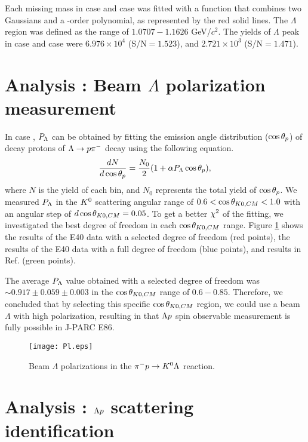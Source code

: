 \documentclass[a4paper,11pt,twoside,twocolumn]{article}
\begin{document}
Each missing mass in case  and case  was fitted with a function that combines two Gaussians and a -order polynomial, as represented by the red solid lines. The $\Lambda$ region was defined as the range of $1.0707 - 1.1626$ GeV/$c^{2}$. The yields of $\Lambda$ peak in case  and case  were $6.976\times10^{4}$ (S/N$=1.523$), and $2.721\times10^{3}$ (S/N$=1.471$).

\section{Analysis : Beam $\Lambda$ polarization measurement}
\label{sec-Pl}

In case , $P_{\Lambda}$ can be obtained by fitting the emission angle distribution ($\cos{\theta_p}$) of decay protons of $\Lambda\to p\pi^{-}$ decay using the following equation.
\begin{equation}
  \frac{dN}{d\cos{\theta_p}} = \frac{N_0}{2}(1+\alpha P_{\Lambda}\cos{\theta_p}), 
  \label{eq-costp}
\end{equation}
where $N$ is the yield of each bin, and $N_0$ represents the total yield of $\cos{\theta_p}$. We measured $P_{\Lambda}$ in the $K^{0}$ scattering angular range of $0.6<\cos{\theta_{K0,CM}}<1.0$ with an angular step of $d\cos{\theta_{K0,CM}} = 0.05$. To get a better $\chi^{2}$ of the fitting, we investigated the best degree of freedom in each $\cos{\theta_{K0,CM}}$ range. Figure \ref{fig-Pl} shows the results of the E40 data with a selected degree of freedom (red points), the results of the E40 data with a full degree of freedom (blue points), and results in Ref. \cite{Baker} (green points). 

The average $P_{\Lambda}$ value obtained with a selected degree of freedom was $\sim0.917\pm0.059\pm0.003$ in the $\cos{\theta_{K0,CM}}$ range of $0.6 - 0.85$. Therefore, we concluded that by selecting this specific $\cos{\theta_{K0,CM}}$ region, we could use a beam $\Lambda$ with high polarization, resulting in that $\Lambda p$ spin observable measurement is fully possible in J-PARC E86.

\begin{figure}[h]
  \centering
  \texttt{[image: Pl.eps]}
  \caption{Beam $\Lambda$ polarizations in the $\pi^- p \to K^0 \Lambda$ reaction.}
  \label{fig-Pl}
\end{figure}


\section{Analysis : $\Lambda p$ scattering identification}
\label{sec-Lp_2p}
\end{document}

